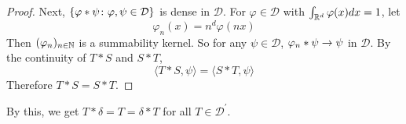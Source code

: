 \begin{enumerate}[label=\arabic*.]
\begin{proof}
		\noindent Next, $\left\{\varphi * \psi \colon \varphi,\psi \in \mathcal{D}\right\}$ is dense in $\mathcal{D}$. For $\varphi \in \mathcal{D}$ with $\int_{\mathbb{R}^d} \varphi(x) dx = 1$, let
		\begin{equation*}
			\varphi_n(x) = n^d\varphi(nx)
		\end{equation*}
		Then $(\varphi_n)_{n \in \mathbb{N}}$ is a summability kernel. So for any $\psi \in \mathcal{D}$, $\varphi_n * \psi \rightarrow \psi$ in $\mathcal{D}$. By the continuity of $T*S$ and $S*T$,
		\begin{equation*}
			\langle T * S, \psi\rangle=\langle S * T, \psi\rangle
		\end{equation*}
		Therefore $T*S =S*T$.
	\end{proof}
	By this, we get $T * \delta=T=\delta * T$ for all $T \in \mathcal{D}^\prime$.


\end{enumerate}

